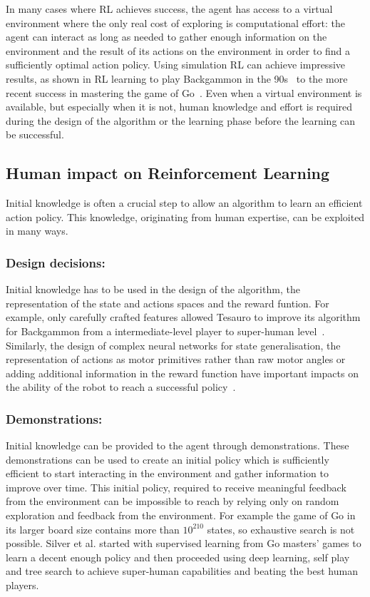 \documentclass[letterpaper]{article} %
\begin{document}
In many cases where RL achieves success, the agent
has access to a virtual environment where the only real cost of exploring is 
computational effort: the agent can interact as long as needed to gather
enough information on the environment and the result of its actions on the environment in order to find a sufficiently optimal action policy. Using simulation RL can achieve impressive results, as shown in RL learning to play Backgammon in the
90s~\cite{tesauro1995temporal} to the more recent success in mastering the game
of Go~\cite{silver2016mastering}. Even when a virtual environment is available,
but especially when it is not, human knowledge and effort is required during the
design of the algorithm or the learning phase before the learning can be successful.

\subsection{Human impact on Reinforcement Learning}

Initial knowledge is often a crucial step to allow an algorithm to learn an
efficient action policy. This knowledge, originating from human expertise, can
be exploited in many ways. 

\subsubsection{Design decisions:}
Initial knowledge has to be used in the design of the algorithm, the
representation of the state and actions spaces and the reward funtion. For
example, only carefully crafted features allowed
Tesauro to improve its algorithm for Backgammon from a intermediate-level player
to super-human level~\cite{tesauro1995temporal}. Similarly, the design of
complex neural networks for state generalisation, the representation of actions
as motor primitives rather than raw motor angles or adding additional
information in the reward function have important impacts on the ability of
the robot to reach a successful policy~\cite{kober2013reinforcement}.

\subsubsection{Demonstrations:}
Initial knowledge can be provided to the agent through demonstrations.
These demonstrations can be used to create an initial policy which is sufficiently
efficient to start interacting in the environment and gather information to
improve over time. This initial policy, required to receive meaningful feedback
from the environment can be impossible to reach by relying only on random
exploration and feedback from the environment. For example the game of Go in its larger board
size contains more than $10^{210}$ states, so exhaustive search is not possible.
Silver et al. \cite{silver2016mastering} started with
supervised learning from Go masters' games to learn a decent enough policy and then
proceeded using deep learning, self play and tree search to achieve super-human
capabilities and beating the best human players.
\end{document}
